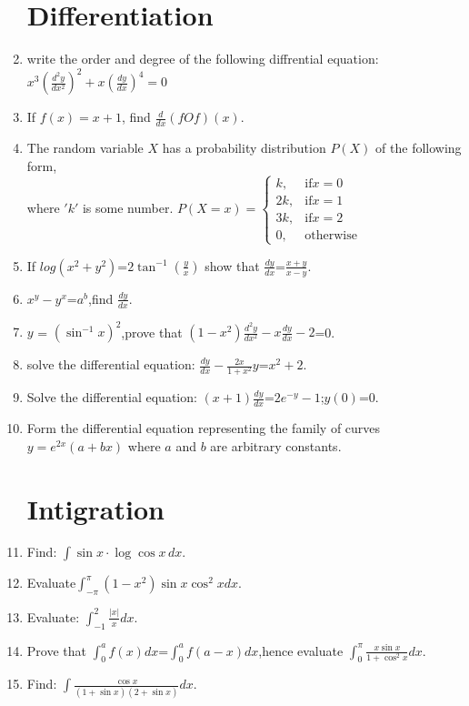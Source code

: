 \documentclass[12pt,-letter paper]{article}
\providecommand{\brak}[1]{\ensuremath{\left(#1\right)}}
\providecommand{\brak}[1]{\ensuremath{\left(#1\right)}}
\begin{document}
\begin{enumerate}
\section{Differentiation}
\item write the order and degree of the following diffrential equation:\\
$x^{3}\left(\frac{d^{2}y}{dx^{2}}\right)^2 +x\left(\frac{dy}{dx}\right)^4 = 0$
\item If $f(x) = x + 1$, find $\frac{d}{dx}\brak{fOf}(x)$.
\item The random variable $X$ has a probability distribution $P(X)$ of the following form,
\\where $'k'$ is some number.                        $ P\brak{X=x} = \begin{cases}
k, & \text{if} x=0 \\
2k, & \text{if} x=1 \\
3k, & \text{if} x=2 \\
0, & \text{otherwise}
\end{cases}$
\item If $log\brak{x^{2}+y^{2}}$=$2\tan^{-1}\brak{\frac{y}{x}}$ show that $\frac{dy}{dx}$=$\frac{x+y}{x-y}$.
\item $x^{y}-y^{x}$=$a^{b}$,find $\frac{dy}{dx}$.
\item $y$ = $\brak{\sin^{-1}x}^{2}$,prove that $\brak{1-x^{2}}\frac{d^{2}y}{dx^{2}}-x\frac{dy}{dx}-2$=0.
\item solve the differential equation: $\frac{dy}{dx}-\frac{2x}{1+x^{2}}y$=$x^{2}+2$.
\item Solve the differential equation: $\brak{x+1}\frac{dy}{dx}$=$2e^{-y}-1$;$y\brak{0}$=0.
\item Form the differential equation representing the family of curves $y = e^{2x}\brak{a + bx}$ where $a$ and $b$ are arbitrary constants.
\section{Intigration}
\item Find: $\int \sin{x}\cdot\log\cos{x} \,dx$.
\item Evaluate$\int_{-\pi}^{\pi} \brak{1 - x^2} \sin{x}\cos^2{x} dx$.
\item Evaluate: $\int_{-1}^{2} \frac{|x|}{x} dx$.
\item Prove that $\int_{0}^{a}{f(x)dx}$=$\int_{0}^{a}{f\brak{a-x}dx}$,hence evaluate $\int_{0}^{\pi}{\frac{x \sin{x}}{1+\cos^{2}x}dx}$.
\item Find: $\int{\frac{\cos{x}}{\brak{1+\sin{x}}\brak{2+\sin{x}}}}dx $.

\end{enumerate}
\end{document}
